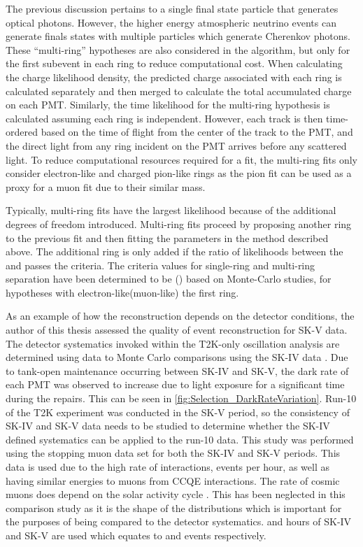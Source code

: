The previous discussion pertains to a single final state particle that generates optical photons. However, the higher energy atmospheric neutrino events can generate finals states with multiple particles which generate Cherenkov photons. These ``multi-ring'' hypotheses are also considered in the \fq algorithm, but only for the first subevent in each ring to reduce computational cost. When calculating the charge likelihood density, the predicted charge associated with each ring is calculated separately and then merged to calculate the total accumulated charge on each PMT. Similarly, the time likelihood for the multi-ring hypothesis is calculated assuming each ring is independent. However, each track is then time-ordered based on the time of flight from the center of the track to the PMT, and the direct light from any ring incident on the PMT arrives before any scattered light. To reduce computational resources required for a fit, the multi-ring fits only consider electron-like and charged pion-like rings as the pion fit can be used as a proxy for a muon fit due to their similar mass.

Typically, multi-ring fits have the largest likelihood because of the additional degrees of freedom introduced. Multi-ring fits proceed by proposing another ring to the previous fit and then fitting the parameters in the method described above. The additional ring is only added if the ratio of likelihoods between the  and  passes the criteria. The criteria values for single-ring and multi-ring separation have been determined to be () based on Monte-Carlo studies, for hypotheses with electron-like(muon-like) the first ring.

As an example of how the reconstruction depends on the detector conditions, the author of this thesis assessed the quality of event reconstruction for SK-V data. The detector systematics invoked within the T2K-only oscillation analysis are determined using data to Monte Carlo comparisons using the SK-IV data \cite{t2k_tn_326}. Due to tank-open maintenance occurring between SK-IV and SK-V, the dark rate of each PMT was observed to increase due to light exposure for a significant time during the repairs. This can be seen in \autoref{fig:Selection_DarkRateVariation}. Run-10 of the T2K experiment was conducted in the SK-V period, so the consistency of SK-IV and SK-V data needs to be studied to determine whether the SK-IV defined systematics can be applied to the run-10 data. This study was performed using the stopping muon data set for both the SK-IV and SK-V periods. This data is used due to the high rate of interactions,  events per hour, as well as having similar energies to muons from CCQE \quickmath{\nu_{\mu}} interactions. The rate of cosmic muons does depend on the solar activity cycle \cite{Maghrabi2021}. This has been neglected in this comparison study as it is the shape of the distributions which is important for the purposes of being compared to the detector systematics.  and  hours of SK-IV and SK-V are used which equates to  and  events respectively.

